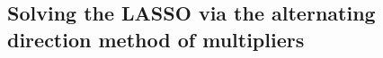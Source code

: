 \documentclass[final,onefignum,onetabnum]{siamart190516}
\begin{document}
\subsection{Solving the LASSO  via the alternating direction method of multipliers}
\end{document}
